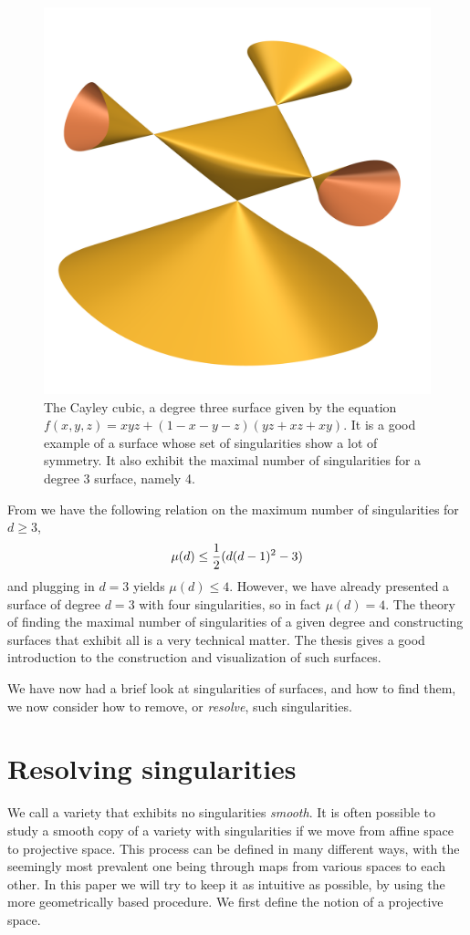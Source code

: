 \documentclass{article}
\begin{document}
\begin{example}
        \begin{figure}[h!]
            \centering
            \includegraphics[width=0.3\linewidth]{pictures/cayley_cubic.png}
            \caption{The Cayley cubic, a degree three surface given by the
                equation $f(x, y, z) = xyz + (1 - x  - y - z)(yz + xz + xy)$.
                It is a good example of a surface whose set of singularities
                show a lot of symmetry. It also exhibit the maximal number of
                singularities for a degree $3$ surface, namely 4.}
            \label{fig:cayley}
        \end{figure}
    \end{example}     
    
    From \cite[p.~7]{Lab14} we have the following relation on the maximum
    number of singularities for $d \geq 3$,
    \begin{equation}
        \notag
        \mu(d) \leq \frac{1}{2}(d(d-1)^2 - 3)
    \end{equation}
    and plugging in $d = 3$ yields $\mu(d) \leq 4$. However, we have already
    presented a surface of degree $d = 3$ with four singularities, so in fact
    $\mu(d) = 4$. The theory of finding the maximal number of singularities of
    a given degree and constructing surfaces that exhibit all is a very
    technical matter. The thesis \cite{oliver2005hypersurfaces} gives a good
    introduction to the construction and visualization of such surfaces.

    We have now had a brief look at singularities of surfaces, and how to find
    them, we now consider how to remove, or \emph{resolve}, such singularities.
    
    \section{Resolving singularities}
    \label{sec:resolving_singularities}
    
    We call a variety that exhibits no singularities \emph{smooth}. It is often possible to study a smooth copy of a variety with
    singularities if we move from affine space to projective space. This
    process can be defined in many different ways, with the seemingly most
    prevalent one being through maps from various spaces to each other. In this
    paper we will try to keep it as intuitive as possible, by using the more
    geometrically based procedure. We first define the notion of a projective
    space.
\end{document}
